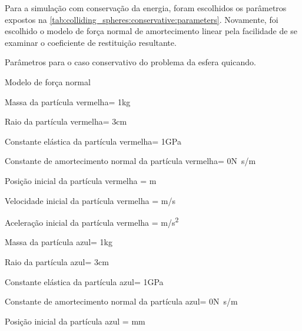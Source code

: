 Para a simulação com conservação da energia, foram escolhidos os parâmetros expostos na \cref{tab:colliding_spheres:conservative:parameters}. Novamente, foi escolhido o modelo de força normal de amortecimento linear pela facilidade de se examinar o coeficiente de restituição resultante.

\begin{table}[h]
\centering
\caption{Parâmetros para o caso conservativo do problema da esfera quicando.}
\label{tab:colliding_spheres:conservative:parameters}
\begin{parametersdesc}{\textwidth}
	\item{Modelo de força normal}{}{\emptyUnit}
	\hline
	\item{Massa da partícula vermelha}{\redMass = 1}{\si\kilogram}
	\item{Raio da partícula vermelha}{\redRadius = 3}{\si\centi\metre}
	\item{Constante elástica da partícula vermelha}{\redElasticModulus = 1}{\si[per-mode=symbol]{\giga\pascal}}
	\item{Constante de amortecimento normal da partícula vermelha}{\redNormalDampingConstant = 0}{\si[per-mode=symbol]{\newton\second\per\meter}}
	\hline
	\item{Posição inicial da partícula vermelha}{\initial{\redPosition} = }{\si{\metre}}
	\item{Velocidade inicial da partícula vermelha}{\initial{\redVelocity} = }{\si[per-mode=symbol]{\metre\per\second}}
	\item{Aceleração inicial da partícula vermelha}{\initial{\redAcceleration} = }{\si[per-mode=symbol]{\metre\per\square\second}}
	\hline
	\item{Massa da partícula azul}{\blueMass = 1}{\si\kilogram}
	\item{Raio da partícula azul}{\blueRadius = 3}{\si\centi\metre}
	\item{Constante elástica da partícula azul}{\blueElasticModulus = 1}{\si[per-mode=symbol]{\giga\pascal}}
	\item{Constante de amortecimento normal da partícula azul}{\blueNormalDampingConstant = 0}{\si[per-mode=symbol]{\newton\second\per\meter}}
	\hline
	\item{Posição inicial da partícula azul}{\initial{\bluePosition} = }{\si{\milli\metre}}

\end{parametersdesc}
\end{table}
